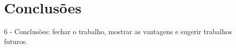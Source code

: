 \chapter{Conclusões}


6 - Conclusões: fechar o trabalho, mostrar as vantagens e sugerir trabalhos futuros.
